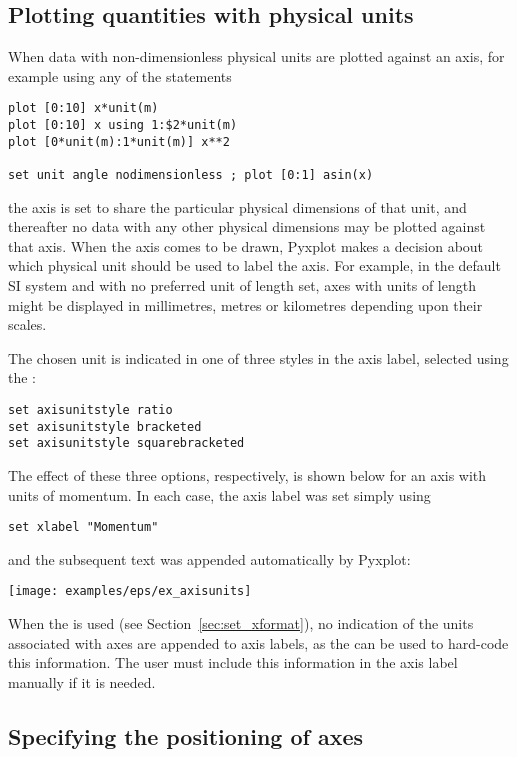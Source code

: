 \subsection{Plotting quantities with physical units}
\label{sec:set_axisunitstyle}

When data with non-dimensionless physical units are plotted against an axis,
for example using any of the statements
\begin{verbatim}
plot [0:10] x*unit(m)
plot [0:10] x using 1:$2*unit(m)
plot [0*unit(m):1*unit(m)] x**2

set unit angle nodimensionless ; plot [0:1] asin(x)
\end{verbatim}
the axis is set to share the particular physical dimensions of that unit, and
thereafter no data with any other physical dimensions may be plotted against
that axis. When the axis comes to be drawn, Pyxplot makes a decision about
which physical unit should be used to label the axis. For example, in the
default SI system and with no preferred unit of length set, axes with units of
length might be displayed in millimetres, metres or kilometres depending upon
their scales.

The chosen unit is indicated in one of three styles in the axis label, selected
using the :
\begin{verbatim}
set axisunitstyle ratio
set axisunitstyle bracketed
set axisunitstyle squarebracketed
\end{verbatim}
The effect of these three options, respectively, is shown below for an axis
with units of momentum. In each case, the axis label was set simply using
\begin{verbatim}
set xlabel "Momentum"
\end{verbatim}
and the subsequent text was appended automatically by Pyxplot:

\vspace{3mm}
\centerline{\texttt{[image: examples/eps/ex\_axisunits]}}
\vspace{3mm}

When the  is used (see Section~\ref{sec:set_xformat}), no
indication of the units associated with axes are appended to axis labels, as
the  can be used to hard-code this information. The user
must include this information in the axis label manually if it is needed.

\subsection{Specifying the positioning of axes}

